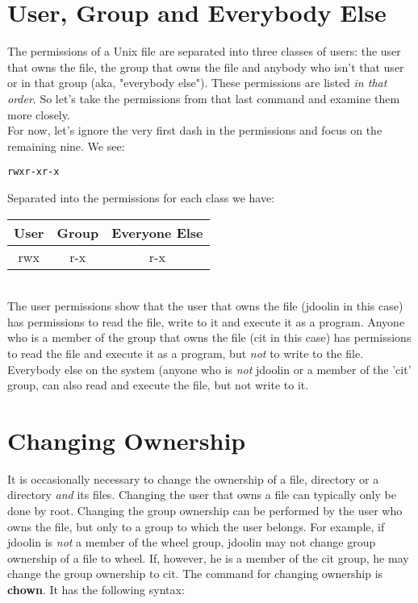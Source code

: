 \section{User, Group and Everybody Else}

The permissions of a Unix file are separated into three classes of users:  the user that owns the file, the group that owns the file and anybody who isn't that user or in that group (aka, "everybody else").  These permissions are listed \textit{in that order}.  So let's take the permissions from that last command and examine them more closely.\\

For now, let's ignore the very first dash in the permissions and focus on the remaining nine.  We see:

\begin{verbatim}
rwxr-xr-x
\end{verbatim}

Separated into the permissions for each class we have:\\

\begin{tabular}{|c|c|c|}
   \hline
   User & Group & Everyone Else \\
   \hline
   rwx & r-x & r-x \\
   \hline
\end{tabular} \\

The user permissions show that the user that owns the file (jdoolin in this case) has permissions to read the file, write to it and execute it as a program.  Anyone who is a member of the group that owns the file (cit in this case) has permissions to read the file and execute it as a program, but \textit{not} to write to the file.  Everybody else on the system (anyone who is \textit{not} jdoolin or a member of the 'cit' group, can also read and execute the file, but not write to it.

\section{Changing Ownership}

It is occasionally necessary to change the ownership of a file, directory or a directory \textit{and} its files.  Changing the user that owns a file can typically only be done by root.  Changing the group ownership can be performed by the user who owns the file, but only to a group to which the user belongs.  For example, if jdoolin is \textit{not} a member of the wheel group, jdoolin may not change group ownership of a file to wheel.  If, however, he is a member of the cit group, he may change the group ownership to cit.  The command for changing ownership is \textbf{chown}.  It has the following syntax:

